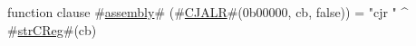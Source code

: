 function clause #\hyperref[sailMIPSzassembly]{assembly}# (#\hyperref[sailMIPSzCJALR]{CJALR}#(0b00000, cb, false)) = "cjr " ^ #\hyperref[sailMIPSzstrCReg]{strCReg}#(cb)
